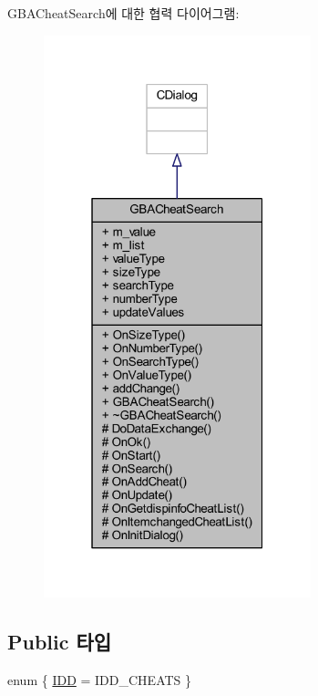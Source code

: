 G\+B\+A\+Cheat\+Search에 대한 협력 다이어그램\+:\nopagebreak
\begin{figure}[H]
\begin{center}
\leavevmode
\includegraphics[width=220pt]{class_g_b_a_cheat_search__coll__graph}
\end{center}
\end{figure}
\subsection*{Public 타입}
\begin{DoxyCompactItemize}
\item 
enum \{ \mbox{\hyperlink{class_g_b_a_cheat_search_aad94fa4948a9a182e3d5a15c5d0bf02fa210cc376f2b661862a7031b55a0e5ceb}{I\+DD}} = I\+D\+D\+\_\+\+C\+H\+E\+A\+TS
 \}
\end{DoxyCompactItemize}
